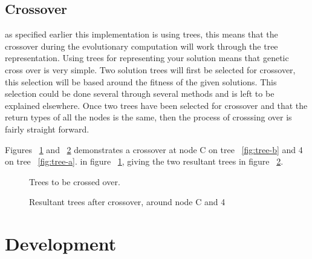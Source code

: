 \documentclass[12pt]{article}
\begin{document}
\subsection{Crossover}

as specified earlier this implementation is using trees, this means that the crossover during the evolutionary computation
will work through the tree representation. Using trees for representing your solution means that genetic cross over is
very simple. Two solution trees will first be selected for crossover, this selection will be based around the fitness of the given
solutions. This selection could be done several through several methods and is left to be explained elsewhere. Once two trees
have been selected for crossover and that the return types of all the nodes is the same, then the process of crosssing over
is fairly straight forward.

Figures ~\ref{fig:treesab} and ~\ref{fig:resultanttrees} demonstrates a crossover at node C on tree ~\ref{fig:tree-b} and 4 on tree ~\ref{fig:tree-a}. in
figure  ~\ref{fig:treesab}, giving the two resultant trees in figure ~\ref{fig:resultanttrees}.

\begin{figure} [ht]
\centering
\subfigure[]{\label{fig:tree-b}\Tree [.A [ D E ].B [ F G H I ].C ]}
\hfil
\subfigure[]{\label{fig:tree-a}\Tree [.1 [ 4 5 6 7 ].2 [ 8 9 ].3 ]}
\caption{Trees to be crossed over.\label{fig:treesab}}
\end{figure}

\begin{figure} [ht]
\centering
\subfigure[]{\label{fig:tree-Ra}\Tree [.A [ D E ].B 4 ]}
\hfil
{}
\caption{Resultant trees after crossover, around node C and 4 \label{fig:resultanttrees}}
\end{figure}


\section{Development}
\end{document}
